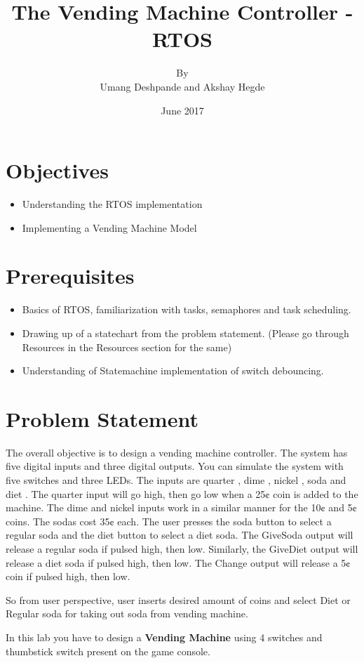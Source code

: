 \documentclass{article}
\title{The Vending Machine Controller - RTOS}
\author{By \\ Umang Deshpande and Akshay Hegde}
\date{June 2017}
\begin{document}
\maketitle

\section{Objectives}
\begin{itemize}
    \item Understanding the RTOS implementation
    \item Implementing a Vending Machine Model
\end{itemize}
\section{Prerequisites}
\begin{itemize}
    \item Basics of RTOS, familiarization with tasks, semaphores and task scheduling.
    \item Drawing up of a statechart from the problem statement. (Please go through Resources in the Resources section for the same)
    \item Understanding of Statemachine implementation of switch debouncing.
\end{itemize}
\section{Problem Statement}
The overall objective is to design a vending machine controller. The system has five digital inputs and three digital outputs. You can simulate the system with five switches and three LEDs. The inputs are quarter , dime , nickel , soda and diet . The quarter input will go high, then go low when a 25¢ coin is added to the machine. The dime and nickel inputs work in a similar manner for the 10¢  and 5¢ coins. The sodas cost 35¢ each. The user presses the soda button to select a regular soda and the diet button to select a diet soda. The GiveSoda output will release a regular soda if pulsed high, then low. Similarly, the GiveDiet output will release a diet soda if pulsed high, then low. The Change output will release a 5¢ coin if pulsed high, then low.

So from user perspective, user inserts desired amount of coins and select Diet or Regular soda for taking out soda from vending machine.

In this lab you have to design a \textbf{Vending Machine} using 4 switches and thumbstick switch present on the game console. 
\end{document}
